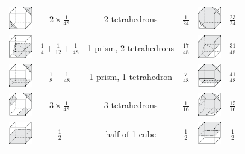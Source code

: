\documentclass[11pt]{article}
\begin{document}
\begin{table}[]
\begin{tabular}{c|c|c|c|c|c}
        \includegraphics[width=1cm]{Figures/case 5.png} & $2 \times \frac{1}{48}$ & 2 tetrahedrons & $\frac{1}{24}$ & \includegraphics[width=1cm]{Figures/case 20.png} & $\frac{23}{24}$ \\

        \includegraphics[width=1cm]{Figures/case 6.png} & $\frac{1}{4} + \frac{1}{12} + \frac{1}{48}$ & 1 prism, 2 tetrahedrons & $\frac{17}{48}$ & \includegraphics[width=1cm]{Figures/case 21.png} & $\frac{31}{48}$ \\

        \includegraphics[width=1cm]{Figures/case 7.png} & $\frac{1}{8} + \frac{1}{48}$ & 1 prism, 1 tetrahedron & $\frac{7}{48}$ & \includegraphics[width=1cm]{Figures/case 22.png} & $\frac{41}{48}$ \\

        \includegraphics[width=1cm]{Figures/case 8.png} & $3 \times \frac{1}{48}$ & 3 tetrahedrons & $\frac{1}{16}$ & \includegraphics[width=1cm]{Figures/case 23.png} & $\frac{15}{16}$ \\

        \includegraphics[width=1cm]{Figures/case 9.png} & $\frac{1}{2}$ & half of 1 cube & $\frac{1}{2}$ & \includegraphics[width=1cm]{Figures/case 24.png} & $\frac{1}{2}$ \\


\end{tabular}
\end{table}
\end{document}
